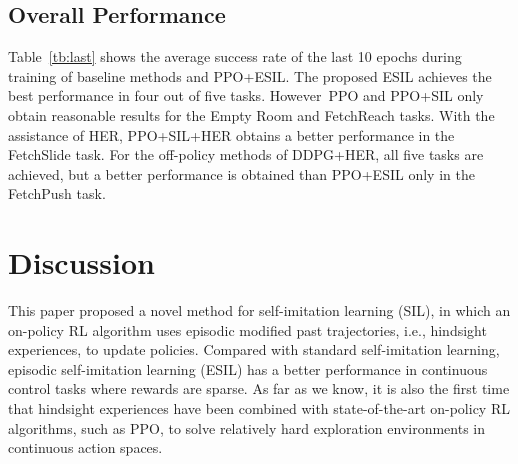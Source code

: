 \subsection{Overall Performance}
{Table~\ref{tb:last}} shows the average success rate of the last 10 epochs during training of baseline methods and PPO+ESIL. The proposed ESIL achieves the best performance in four out of five tasks. However~PPO and PPO+SIL  only obtain reasonable results for the Empty Room and FetchReach tasks. With the assistance of HER, PPO+SIL+HER obtains a better performance in the FetchSlide task. {For the off-policy methods of DDPG+HER, all five tasks are achieved, but a better performance is  obtained than PPO+ESIL only in the FetchPush task}.

\begin{table}[H]
  \caption{Average success rate $\pm$ standard error in the last 10 epochs over five random seeds on all~environments {(\textbf{bold} indicates the best result among all methods).}}
  \label{tb:last}
  \centering
\end{table}

\section{Discussion}
\label{sec:conclusion}
This paper proposed a novel method for self-imitation learning (SIL), in which an on-policy RL algorithm uses episodic modified past trajectories, i.e., hindsight experiences, to update policies. Compared with standard self-imitation learning, episodic self-imitation learning (ESIL) has a better performance in continuous control tasks where rewards are sparse. As far as we know, it is also the first time that hindsight experiences have been combined with state-of-the-art on-policy RL algorithms, such as PPO, to solve relatively hard exploration environments in continuous action spaces.

